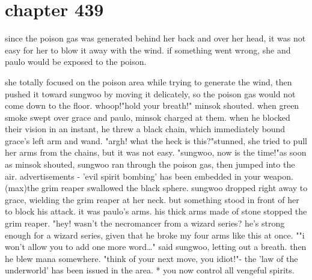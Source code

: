 \section{chapter 439}

since the poison gas was generated behind her back and over her head, it was not easy for her to blow it away with the wind.
 if something went wrong, she and paulo would be exposed to the poison.





she totally focused on the poison area while trying to generate the wind, then pushed it toward sungwoo by moving it delicately, so the poison gas would not come down to the floor.
whoop!"hold your breath!" minsok shouted.
when green smoke swept over grace and paulo, minsok charged at them.
when he blocked their vision in an instant, he threw a black chain, which immediately bound grace's left arm and wand.
"argh! what the heck is this?"stunned, she tried to pull her arms from the chains, but it was not easy.
"sungwoo, now is the time!"as soon as minsok shouted, sungwoo ran through the poison gas, then jumped into the air.
advertisements    - 'evil spirit bombing' has been embedded in your weapon.
 (max)the grim reaper swallowed the black sphere.
 sungwoo dropped right away to grace, wielding the grim reaper at her neck.
but something stood in front of her to block his attack.
 it was paulo's arms.
 his thick arms made of stone stopped the grim reaper.
"hey! wasn't the necromancer from a wizard series? he's strong enough for a wizard series, given that he broke my four arms like this at once.
""i won't allow you to add one more word…" said sungwoo, letting out a breath.
then he blew mana somewhere.
 "think of your next move, you idiot!"- the 'law of the underworld' has been issued in the area.
* you now control all vengeful spirits.
 
